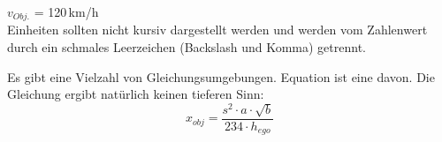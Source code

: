 $v_{Obj.}$ = 120\,km/h \\
Einheiten sollten nicht kursiv dargestellt werden und werden vom Zahlenwert durch ein schmales Leerzeichen (Backslash und Komma) getrennt.

Es gibt eine Vielzahl von Gleichungsumgebungen. Equation ist eine davon. Die Gleichung ergibt natürlich keinen tieferen Sinn:
\begin{equation}
	x_{obj} = \frac{s^{2} \cdot a \cdot \sqrt{b}}{234 \cdot h_{ego}}
\end{equation}

